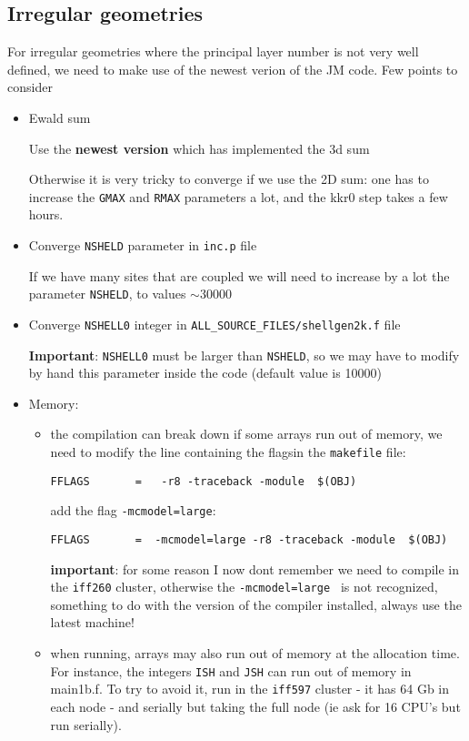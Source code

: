 \documentclass[a4paper,10pt,fullpage]{report}
\begin{document}
\subsection{Irregular geometries}
For irregular geometries where the principal layer number is not very well defined,
we need to make use of the newest verion of the JM code. Few points to consider
\begin{itemize}
\item Ewald sum

Use the \textbf{newest version} which has implemented the 3d sum

Otherwise it is very tricky to converge if we use the 2D sum: one has to increase the \verb|GMAX|
and \verb|RMAX| parameters a lot, and the kkr0 step takes a few hours. 

\item Converge \verb|NSHELD| parameter in \verb|inc.p| file

If we have many sites that are coupled we will need to increase by a lot the parameter 
\verb|NSHELD|, to values $\sim 30000$

\item Converge \verb|NSHELL0| integer in \verb|ALL_SOURCE_FILES/shellgen2k.f| file

\textbf{Important}: \verb|NSHELL0| must be larger than \verb|NSHELD|, so we may have to 
modify by hand this parameter inside the code (default value is 10000)



\item Memory:
\begin{itemize}
\item the compilation can break down if some arrays run out of memory, we need to
modify the line containing the flagsin the \verb|makefile| file:
\begin{verbatim}
FFLAGS       =   -r8 -traceback -module  $(OBJ)
\end{verbatim}
add the flag \verb|-mcmodel=large|:
\begin{verbatim}
FFLAGS       =  -mcmodel=large -r8 -traceback -module  $(OBJ)
\end{verbatim}
\textbf{important}: for some reason I now dont remember we need to compile in the \verb|iff260|
cluster, otherwise the \verb|-mcmodel=large | is not recognized, something to do with the version of
the compiler installed, always use the latest machine!

\item when running, arrays may also run out of memory at the allocation time. For instance, 
the integers \verb|ISH| and \verb|JSH| can run out of memory in main1b.f. To try to avoid it,
run in the \verb|iff597| cluster - it has 64 Gb in each node - and serially but taking the full node 
(ie ask for 16 CPU's but run serially).

 

\end{itemize}

\end{itemize}
\end{document}
